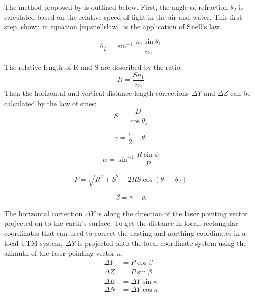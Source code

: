 The method proposed by \citeauthor{Parrish2019} is outlined below. First, the angle of refraction $\theta_2$ is calculated based on the relative speed of light in the air and water. This first step, shown in equation \ref{eq:snellslaw}, is the application of Snell's law.

\begin{equation}\label{eq:snellslaw}
      \theta_2 = \sin^{-1}{\frac{n_1 \sin{\theta_1}}{n_2}}
\end{equation}

The relative length of R and S are described by the ratio:
\begin{equation}
      R = \frac{S n_1}{n_2}
\end{equation}
Then the horizontal and vertical distance length corrections $\Delta Y$ and $\Delta Z$ can be calculated by the law of sines:
\begin{equation}
      S = \frac{D}{\cos{\theta_1}}
\end{equation}

\begin{equation}
      \gamma = \frac{\pi}{2} - \theta_1
\end{equation}

\begin{equation}
      \alpha = \sin^{-1}{\frac{R \sin{\phi}}{P}}
\end{equation}

\begin{equation}
      P = \sqrt{R^2 + S^2 - 2RS \cos{(\theta_1 - \theta_2)}}
\end{equation}

\begin{equation}
      \beta = \gamma - \alpha
\end{equation}

The horizontal correction $\Delta Y$ is along the direction of the laser pointing vector projected on to the earth's surface. To get the distance in local, rectangular coordinates that can used to correct the easting and northing coordinates in a local UTM system, $\Delta Y$ is projected onto the local coordinate system using the azimuth of the laser pointing vector $\kappa$.
\begin{align}
      \Delta Y & = P \cos{\beta}         \\
      \Delta Z & = P \sin{\beta}         \\
      \Delta E & = \Delta Y \sin{\kappa} \\
      \Delta N & = \Delta Y \cos{\kappa}
\end{align}

